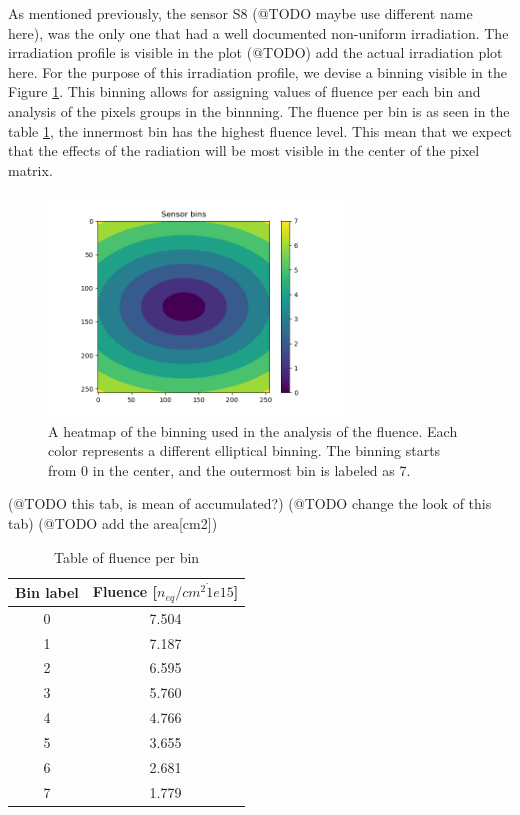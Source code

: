 As mentioned previously, the sensor S8 (@TODO maybe use different name here), was the only one that had a well documented non-uniform irradiation.
The irradiation profile is visible in the plot (@TODO) add the actual irradiation plot here.
For the purpose of this irradiation profile, we devise a binning visible in the Figure \ref{fig:binning}.
This binning allows for assigning values of fluence per each bin and analysis of the pixels groups in the binnning.
The fluence per bin is as seen in the table \ref{tab:fluence_per_bin}, the innermost bin has the highest fluence level.
This mean that we expect that the effects of the radiation will be most visible in the center of the pixel matrix.



\begin{figure}[H]
\centering
\includegraphics[width=0.7\textwidth]{figures/chapter4/surrogates/p2_binning.png}
\caption{A heatmap of the binning used in the analysis of the fluence. Each color represents a different elliptical binning. The binning starts from 0 in the center, and the outermost bin is labeled as 7.}
\label{fig:binning}
\end{figure}

(@TODO this tab, is mean of accumulated?)
(@TODO change the look of this tab)
(@TODO add the area[cm2])

\begin{table}[h]
\begin{center}
\begin{tabular}{ |c|c| }
\hline
Bin label & Fluence [$n_{eq}/cm^{2} \dot 1e15$]\\
\hline
  0 & 7.504 \\

\hline
  1 & 7.187 \\

\hline
  2 & 6.595 \\

\hline
  3 & 5.760 \\
\hline
  4 & 4.766 \\
\hline
  5 & 3.655 \\
\hline
  6 & 2.681 \\
\hline
  7 & 1.779 \\
\hline
\end{tabular}
\caption{\label{tab:fluence_per_bin} Table of fluence per bin}
\end{center}
\end{table}

